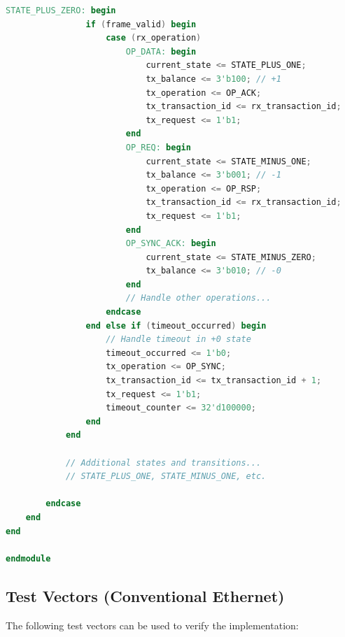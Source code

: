 \documentclass[../OAE-SPEC-MAIN.tex]{subfiles}
\begin{document}
\begin{lstlisting}[language=Verilog]
            STATE_PLUS_ZERO: begin
                if (frame_valid) begin
                    case (rx_operation)
                        OP_DATA: begin
                            current_state <= STATE_PLUS_ONE;
                            tx_balance <= 3'b100; // +1
                            tx_operation <= OP_ACK;
                            tx_transaction_id <= rx_transaction_id;
                            tx_request <= 1'b1;
                        end
                        OP_REQ: begin
                            current_state <= STATE_MINUS_ONE;
                            tx_balance <= 3'b001; // -1
                            tx_operation <= OP_RSP;
                            tx_transaction_id <= rx_transaction_id;
                            tx_request <= 1'b1;
                        end
                        OP_SYNC_ACK: begin
                            current_state <= STATE_MINUS_ZERO;
                            tx_balance <= 3'b010; // -0
                        end
                        // Handle other operations...
                    endcase
                end else if (timeout_occurred) begin
                    // Handle timeout in +0 state
                    timeout_occurred <= 1'b0;
                    tx_operation <= OP_SYNC;
                    tx_transaction_id <= tx_transaction_id + 1;
                    tx_request <= 1'b1;
                    timeout_counter <= 32'd100000;
                end
            end
            
            // Additional states and transitions...
            // STATE_PLUS_ONE, STATE_MINUS_ONE, etc.
            
        endcase
    end
end

endmodule
\end{lstlisting}

\subsection{Test Vectors (Conventional Ethernet)}

The following test vectors can be used to verify the implementation:
\end{document}
